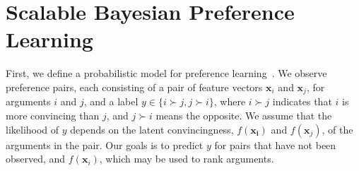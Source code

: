 \section{Scalable Bayesian Preference Learning}\label{sec:model}

First, we define a probabilistic model for preference learning~\cite{chu2005preference}.
We observe preference pairs, each consisting of a pair of feature vectors $\mathbf x_i$ and $\mathbf x_j$, for arguments $i$ and $j$,
and a label $y \in \{i \succ j, j \succ i\}$, where $i \succ j$ indicates that $i$ is more convincing than
$j$, and $j \succ i$ means the opposite.
We assume that the likelihood of $y$ depends on the latent convincingness, $f(\mathbf{x_i})$ and 
$f(\mathbf x_j)$, of the arguments in the pair. 
Our goals is to predict $y$ for pairs that have not been observed, 
and $f(\mathbf x_i)$, which may be used to rank arguments.

